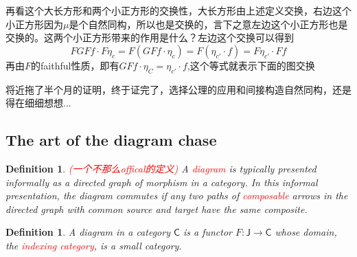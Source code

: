 \documentclass{article}
\newtheorem{definition}[theorem]{Definition}
\newcommand*{\cat}[1]{\textsf{#1}\xspace}
\newcommand{\redt}[1]{\textcolor{red}{#1}}
\begin{document}
再看这个大长方形和两个小正方形的交换性，大长方形由上述定义交换，右边这个小正方形因为$\mu$是个自然同构，所以也是交换的，言下之意左边这个小正方形也是交换的。这两个小正方形带来的作用是什么？左边这个交换可以得到\[FGFf \cdot F\eta_c = F(GFf \cdot \eta_c) = F(\eta_{c'} \cdot f) = F\eta_{c'} \cdot Ff\]再由$F$的faithful性质，即有$GFf \cdot \eta_C = \eta_{c'} \cdot f$,这个等式就表示下面的图交换

\begin{center}
\end{center}

将近拖了半个月的证明，终于证完了，选择公理的应用和间接构造自然同构，还是得在细细想想...

\newpage
\subsection{The art of the diagram chase}

\begin{definition}
\rm \redt{(一个不那么offical的定义)} A \redt{diagram} is typically presented informally as a directed graph of morphism in a category. In this informal presentation, the diagram commutes if any two paths of \redt{composable} arrows in the directed  graph with common source and target  have the same composite.
\end{definition}

\begin{definition}
\rm A diagram in a category $\cat{C}$ is a functor $F:\cat{J} \to \cat{C}$ whose domain, the \redt{indexing category}, is a small category.
\end{definition}
\end{document}
